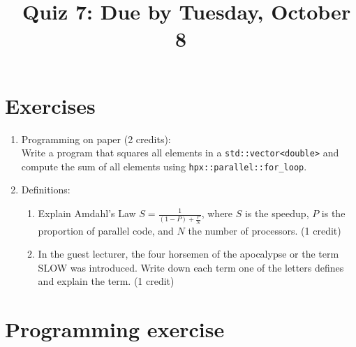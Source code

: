 \documentclass[11pt]{article}
\begin{document}
\title{\coursename~Quiz 7: Due by Tuesday, October 8}
\date{}
\maketitle

\medskip


\section*{Exercises}

\begin{enumerate}
\item Programming on paper (2 credits): \\
Write a program that squares all elements in a \lstinline|std::vector<double>| and compute the sum of all elements using \lstinline|hpx::parallel::for_loop|. 


\item Definitions: \\

\begin{enumerate}
\item Explain Amdahl's Law $S=\frac{1}{(1-P)+\frac{P}{N}}$, where $S$ is the speedup, $P$ is the proportion of parallel code, and $N$ the number of processors. (1 credit)
\item In the guest lecturer, the four horsemen of the apocalypse or the term SLOW was introduced. Write down each term one of the letters defines and explain the term. (1 credit)
\end{enumerate}



\end{enumerate}

\section*{Programming exercise}
\end{document}
